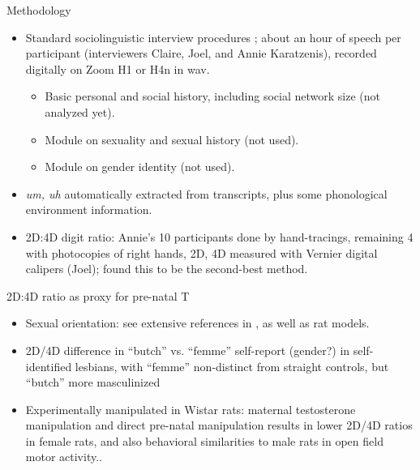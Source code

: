 \documentclass[hyperref={pdfpagelabels=false}]{beamer}
\begin{document}
\begin{frame}{Methodology}
\begin{itemize}
	\item Standard sociolinguistic interview procedures \citep{tagliamonte2006}; about an hour of speech per participant (interviewers Claire, Joel, and Annie Karatzenis), recorded digitally on Zoom H1 or H4n in wav.
		\begin{itemize}
			\item Basic personal and social history, including social network size (not analyzed yet).
			\item Module on sexuality and sexual history (not used).
			\item Module on gender identity (not used).
		\end{itemize}
	\item \textsl{um, uh} automatically extracted from transcripts, plus some phonological environment information.
	\item 2D:4D digit ratio: Annie's 10 participants done by hand-tracings, remaining 4 with photocopies of right hands, 2D, 4D measured with Vernier digital calipers (Joel); \citet{allawayetal2009} found this to be the second-best method.
\end{itemize}
\end{frame}


\begin{frame}{2D:4D ratio as proxy for pre-natal T}
\begin{itemize}
	
	\item Sexual orientation: see extensive references in \citet{balthazart2011}, as well as rat models.
	\item 2D/4D difference in ``butch'' vs. ``femme'' self-report (gender?) in self-identified lesbians, with ``femme'' non-distinct from straight controls, but ``butch'' more masculinized \citep{brownetal2002}
	\item Experimentally manipulated in Wistar rats: maternal testosterone manipulation and direct pre-natal manipulation results in lower 2D/4D ratios in female rats, and also behavioral similarities to male rats in open field motor activity.\citep{talarovicovaetal2009}.
	\end{itemize}

\end{frame}
\end{document}
